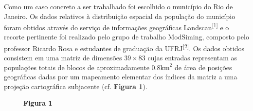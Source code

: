 \documentclass[a4paper,12pt]{article}
\begin{document}
Como um caso concreto a ser trabalhado foi escolhido o município do Rio de Janeiro. Os dados relativos à distribuição espacial da população do município foram obtidos através do serviço de informações geográficas Landscan\textsuperscript{[1]} e o recorte pertinente foi realizado pelo grupo de trabalho ModSiming, composto pelo professor Ricardo Rosa e estudantes de graduação da UFRJ\textsuperscript{[2]}. Os dados obtidos consistem em uma matriz de dimensões $39 \times 83$ cujas entradas representam as populações totais de blocos de aproximadamente $0.8\text{km}^2$ de área de posições geográficas dadas por um mapeamento elementar dos índices da matriz a uma projeção cartográfica subjacente (cf. \textbf{Figura 1}).

\begin{figure}[h]
	\begin{center}
		
	\end{center}
	\vspace{-0.4in}
	\caption*{\textbf{Figura 1}}
\end{figure}
\end{document}
